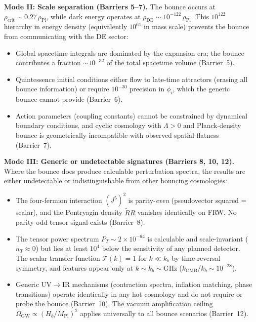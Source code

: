 \medskip
\noindent\textbf{Mode II: Scale separation (Barriers 5--7).}
The bounce occurs at $\rho_\mathrm{crit} \sim 0.27\,\rho_\mathrm{Pl}$, while
dark energy operates at $\rho_\mathrm{DE} \sim 10^{-122}\,\rho_\mathrm{Pl}$.
This $10^{122}$ hierarchy in energy density (equivalently $10^{61}$ in mass
scale) prevents the bounce from communicating with the DE sector:
\begin{itemize}
\item Global spacetime integrals are dominated by the expansion era; the bounce
  contributes a fraction $\sim 10^{-32}$ of the total spacetime volume
  (Barrier~5).
\item Quintessence initial conditions either flow to late-time attractors
  (erasing all bounce information) or require $10^{-30}$ precision in
  $\phi_i$, which the generic bounce cannot provide (Barrier~6).
\item Action parameters (coupling constants) cannot be constrained by dynamical
  boundary conditions, and cyclic cosmology with $\Lambda > 0$ and
  Planck-density bounce is geometrically incompatible with observed spatial
  flatness (Barrier~7).
\end{itemize}

\medskip
\noindent\textbf{Mode III: Generic or undetectable signatures
  (Barriers 8, 10, 12).}
Where the bounce does produce calculable perturbation spectra, the results are
either undetectable or indistinguishable from other bouncing cosmologies:
\begin{itemize}
\item The four-fermion interaction $(J^5)^2$ is parity-\emph{even}
  (pseudovector squared = scalar), and the Pontryagin density $\tilde{R}R$
  vanishes identically on FRW.  No parity-odd tensor signal exists
  (Barrier~8).
\item The tensor power spectrum $P_T \sim 2 \times 10^{-64}$ is calculable and
  scale-invariant ($n_T \approx 0$) but lies at least $10^4$ below the
  sensitivity of any planned detector.  The scalar transfer function
  $\mathcal{T}(k) = 1$ for $k \ll k_b$ by time-reversal symmetry, and
  features appear only at $k \sim k_b \sim \mathrm{GHz}$
  ($k_\mathrm{CMB}/k_b \sim 10^{-28}$).
\item Generic UV$\to$IR mechanisms (contraction spectra, inflation matching,
  phase transitions) operate identically in any hot cosmology and do not
  require or probe the bounce (Barrier~10).  The vacuum amplification ceiling
  $\Omega_\mathrm{GW} \propto (H_b/M_\mathrm{Pl})^2$ applies universally to
  all bounce scenarios (Barrier~12).
\end{itemize}

